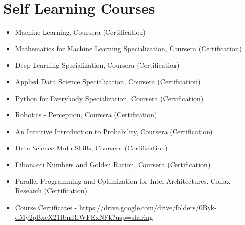 \documentclass[letterpaper,12pt]{article}
\newcommand{\resumeSubHeadingListStart}{\begin{itemize}[leftmargin=*]}
\newcommand{\resumeSubHeadingListEnd}{\end{itemize}}
\begin{document}
\section{Self Learning Courses}
    \resumeSubHeadingListStart
        \item{Machine Learning, Coursera (Certification)}\\
        \item{Mathematics for Machine Learning Specialization, Coursera (Certification)}\\
        \item{Deep Learning Specialization, Coursera (Certification)}\\
        \item{Applied Data Science Specialization, Coursera (Certification)}\\
        \item{Python for Everybody Specialization, Coursera (Certification)}\\
        \item{Robotics - Perception, Coursera (Certification)}\\
        \item{An Intuitive Introduction to Probability, Coursera (Certification)}\\
        \item{Data Science Math Skills, Coursera (Certification)}\\
        \item{Fibonacci Numbers and Golden Ration, Coursera (Certification)}\\
        \item{Parallel Programming and Optimization for Intel Architectures, Colfax Research (Certification)}\\
        \item{Course Certificates - 
            \underline{\href{https://drive.google.com/drive/folders/0Byk-dMy2pBxeX21IbmRlWFExNFk?usp=sharing}{https://drive.google.com/drive/folders/0Byk-dMy2pBxeX21IbmRlWFExNFk?usp=sharing}}}\\
    \resumeSubHeadingListEnd

\end{document}
